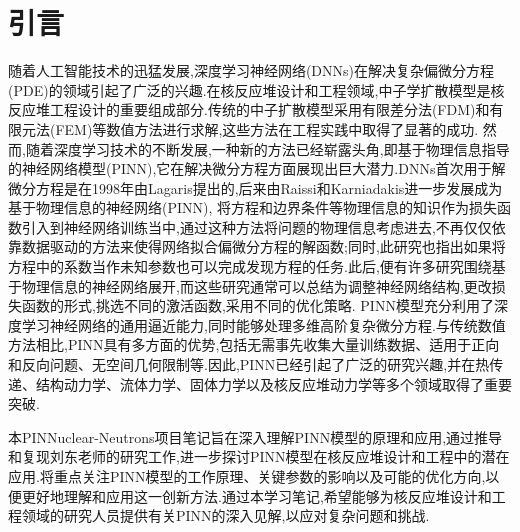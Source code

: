 \documentclass{Sichuan Normal University}
\begin{document}


\maketitle
\newpage
\tableofcontents  %
\clearpage %

\listoffigures %
\listoftables %

\newpage
\section*{引言}
随着人工智能技术的迅猛发展,深度学习神经网络(DNNs)在解决复杂偏微分方程(PDE)的领域引起了广泛的兴趣.在核反应堆设计和工程领域,中子学扩散模型是核反应堆工程设计的重要组成部分.传统的中子扩散模型采用有限差分法(FDM)和有限元法(FEM)等数值方法进行求解,这些方法在工程实践中取得了显著的成功.
然而,随着深度学习技术的不断发展,一种新的方法已经崭露头角,即基于物理信息指导的神经网络模型(PINN),它在解决微分方程方面展现出巨大潜力.DNNs首次用于解微分方程是在1998年由Lagaris提出的\cite{lagarisArtificialNeuralNetworks1998},后来由Raissi和Karniadakis进一步发展成为基于物理信息的神经网络(PINN)\cite{raissiPhysicsinformedNeuralNetworks2019},
将方程和边界条件等物理信息的知识作为损失函数引入到神经网络训练当中,通过这种方法将问题的物理信息考虑进去,不再仅仅依靠数据驱动的方法来使得网络拟合偏微分方程的解函数;同时,此研究也指出如果将方程中的系数当作未知参数也可以完成发现方程的任务.此后,便有许多研究围绕基于物理信息的神经网络展开,而这些研究通常可以总结为调整神经网络结构,更改损失函数的形式,挑选不同的激活函数,采用不同的优化策略.
PINN模型充分利用了深度学习神经网络的通用逼近能力,同时能够处理多维高阶复杂微分方程.与传统数值方法相比,PINN具有多方面的优势,包括无需事先收集大量训练数据、适用于正向和反向问题、无空间几何限制等.因此,PINN已经引起了广泛的研究兴趣,并在热传递、结构动力学、流体力学、固体力学以及核反应堆动力学等多个领域取得了重要突破.

本PINNuclear-Neutrons项目笔记旨在深入理解PINN模型的原理和应用,通过推导和复现刘东老师的研究工作\cite{LiuDongJiYuPINNShenDuJiQiXueXiJiShuQiuJieDuoWeiZhongZiXueKuoSanFangCheng2022},进一步探讨PINN模型在核反应堆设计和工程中的潜在应用.将重点关注PINN模型的工作原理、关键参数的影响以及可能的优化方向,以便更好地理解和应用这一创新方法.通过本学习笔记,希望能够为核反应堆设计和工程领域的研究人员提供有关PINN的深入见解,以应对复杂问题和挑战.
\end{document}
